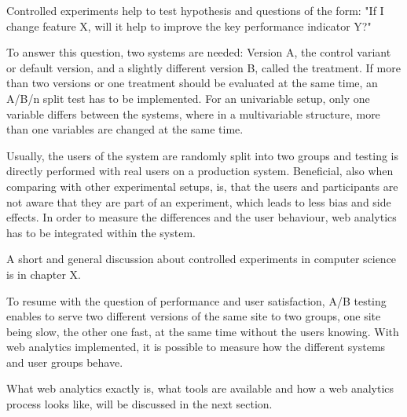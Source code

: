 Controlled experiments help to test hypothesis and questions of the form: "If I change feature X, will it help to improve the key performance indicator Y?"

To answer this question,  two systems are needed: Version A, the control variant or default version, and a slightly different version B, called the treatment.
If more than two versions or one treatment should be evaluated at the same time,  an A/B/n split test has to be implemented.
For an univariable setup, only one variable differs between the systems, where in a multivariable structure, more than one variables are changed at the same time.

Usually, the users of the system are randomly split into two groups and testing is directly performed with real users on a production system.
Beneficial, also when comparing with other experimental setups, is, that the users and participants are not aware that they are part of an experiment, which leads to less bias and side effects.
In order to measure the differences and the user behaviour, web analytics has to be integrated within the system.




A short and general discussion about controlled experiments in computer science is in chapter X. %



To resume with the question of performance and user satisfaction,  A/B testing enables to serve two different versions of the same site to two groups, one site being slow, the other one fast, at the same time without the users knowing.
With web analytics implemented, it is possible to measure how the different systems and user groups behave.

What web analytics exactly is, what tools are available and how a web analytics process looks like, will be discussed in the next section.




